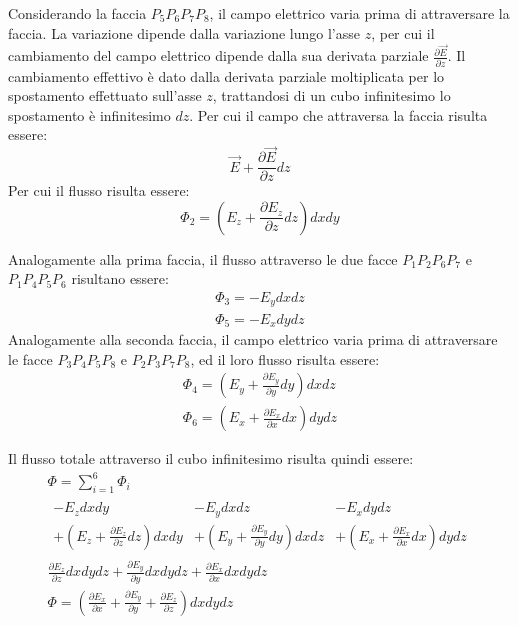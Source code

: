 \documentclass{article}
\numberwithin{equation}{subsection}
\begin{document}
Considerando la faccia $P_5P_6P_7P_8$, il campo elettrico varia prima di attraversare la faccia. La variazione dipende dalla variazione lungo l'asse $z$, per cui il cambiamento 
del campo elettrico dipende dalla sua derivata parziale $\displaystyle\frac{\partial\vec{E}}{\partial z}$. Il cambiamento effettivo è dato dalla derivata parziale 
moltiplicata per lo spostamento effettuato sull'asse $z$, trattandosi di un cubo infinitesimo lo spostamento è infinitesimo $dz$. Per cui il campo che attraversa la faccia 
risulta essere:
\begin{equation*}
    \vec{E}+\displaystyle\frac{\partial \vec{E}}{\partial z}dz
\end{equation*} 
Per cui il flusso risulta essere:
\begin{equation*}
    \Phi_2=\left(E_z+\displaystyle\frac{\partial E_z}{\partial z}dz\right)dxdy
\end{equation*}

Analogamente alla prima faccia, il flusso attraverso le due facce $P_1P_2P_6P_7$ e $P_1P_4P_5P_6$ risultano essere:
\begin{gather*}
    \Phi_3=-E_ydxdz\\
    \Phi_5=-E_xdydz
\end{gather*}
Analogamente alla seconda faccia, il campo elettrico varia prima di attraversare le facce $P_3P_4P_5P_8$ e $P_2P_3P_7P_8$, ed il loro flusso risulta essere:
\begin{gather*}
    \Phi_4=\left(E_y+\displaystyle\frac{\partial E_y}{\partial y}dy\right)dxdz\\
    \Phi_6=\left(E_x+\displaystyle\frac{\partial E_x}{\partial x}dx\right)dydz
\end{gather*}

Il flusso totale attraverso il cubo infinitesimo risulta quindi essere:
\begin{gather*}
    \Phi=\displaystyle\sum_{i=1}^6\Phi_i\\
    \begin{matrix}
        -E_zdxdy & -E_ydxdz & -E_xdydz\\
        +\left(E_z+\displaystyle\frac{\partial E_z}{\partial z}dz\right)dxdy & +\left(E_y+\displaystyle\frac{\partial E_y}{\partial y}dy\right)dxdz & +\left(E_x+\displaystyle\frac{\partial E_x}{\partial x}dx\right)dydz
    \end{matrix}\\
    \displaystyle\frac{\partial E_z}{\partial z}dxdydz+\frac{\partial E_y}{\partial y}dxdydz+\frac{\partial E_x}{\partial x}dxdydz\\
    \Phi=\left(\displaystyle\frac{\partial E_x}{\partial x}+\frac{\partial E_y}{\partial y}+\frac{\partial E_z}{\partial z}\right)dxdydz
\end{gather*}
\end{document}
